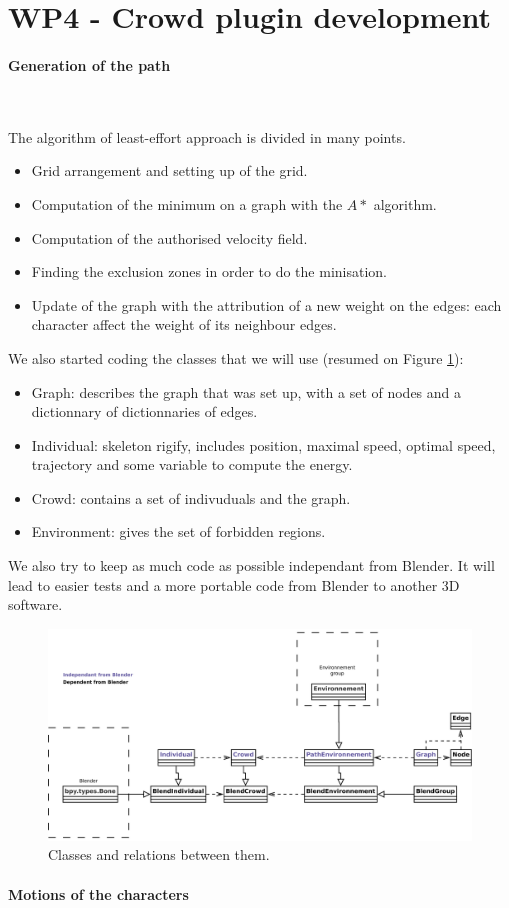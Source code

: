 \section{WP4 - Crowd plugin development}

\paragraph{Generation of the path}~

\noindent The algorithm of least-effort approach is divided in many points.
\begin{itemize}
  \item Grid arrangement and setting up of the grid.
  \item Computation of the minimum on a graph with the $A*$ algorithm.
  \item Computation of the authorised velocity field.
  \item Finding the exclusion zones in order to do the minisation.
  \item Update of the graph with the attribution of a new weight on the edges: each character affect the weight of its neighbour edges.
\end{itemize}

\noindent We also started coding the classes that we will use (resumed on Figure \ref{crowd_classes}):
\begin{itemize}
  \item Graph: describes the graph that was set up, with a set of nodes and a dictionnary of dictionnaries of edges.
  \item Individual: skeleton rigify, includes position, maximal speed, optimal speed, trajectory and some variable to compute the energy.
  \item Crowd: contains a set of indivuduals and the graph.
  \item Environment: gives the set of forbidden regions.
\end{itemize}

We also try to keep as much code as possible independant from Blender. It will lead to easier tests and a more portable code from Blender to another 3D software.

\begin{figure}[h]
  \includegraphics[width=15cm]{crowd_final.pdf}
  \caption{Classes and relations between them.}
  \label{crowd_classes}
\end{figure}

\paragraph{Motions of the characters}~
